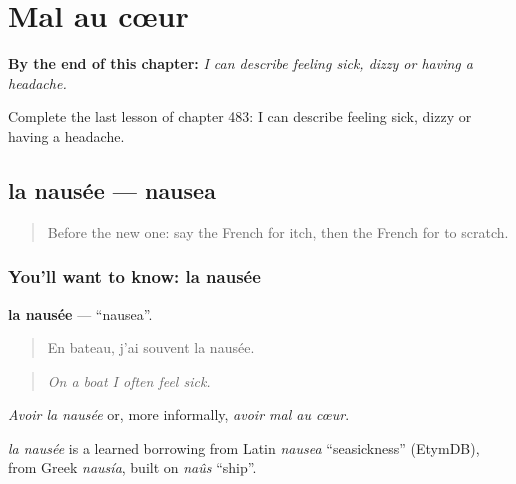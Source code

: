 
\chapter{Mal au cœur}
\label{ch:fr-mal-au-c-ur}

\begin{chapteropening}
\textbf{By the end of this chapter:} \emph{I can describe feeling sick, dizzy or having a headache.}

Complete the last lesson of chapter 483: I can describe feeling sick, dizzy or having a headache.
\end{chapteropening}

\section[la nausée]{la nausée — nausea}

\label{lesson:FR-C483-nausee}



\begin{quote}
Before the new one: say the French for itch, then the French for to scratch.
\end{quote}

\subsection*{You'll want to know: la nausée}
\textbf{la nausée} — \textquotedblleft{}nausea\textquotedblright{}.

\begin{quote}
En bateau, j'ai souvent la nausée.
\end{quote}

\begin{quote}
\emph{On a boat I often feel sick.}
\end{quote}

\emph{Avoir la nausée} or, more informally, \emph{avoir mal au cœur}.

\begin{cousinweb}
\emph{la nausée} is a learned borrowing from Latin \emph{nausea} \textquotedblleft{}seasickness\textquotedblright{} (EtymDB), from Greek \emph{nausía}, built on \emph{naûs} \textquotedblleft{}ship\textquotedblright{}.
\end{cousinweb}

